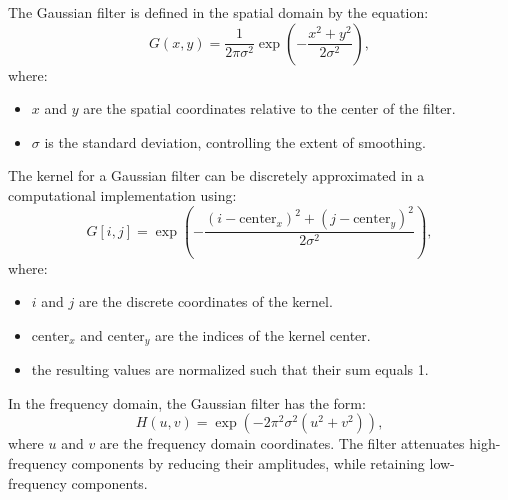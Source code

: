 \documentclass[11pt, conference, letterpaper]{IEEEtran}
\begin{document}
The Gaussian filter is defined in the spatial domain by the equation:
\[
G(x, y) = \frac{1}{2\pi\sigma^2} \exp\left(-\frac{x^2 + y^2}{2\sigma^2}\right),
\]
where:
\begin{itemize}
    \item \(x\) and \(y\) are the spatial coordinates relative to the center of the filter.
    \item \(\sigma\) is the standard deviation, controlling the extent of smoothing.
\end{itemize}

The kernel for a Gaussian filter can be discretely approximated in a computational implementation using:
\[
G[i, j] = \exp\left(-\frac{(i - \text{center}_x)^2 + (j - \text{center}_y)^2}{2\sigma^2}\right),
\]
where:
\begin{itemize}
    \item \(i\) and \(j\) are the discrete coordinates of the kernel.
    \item \(\text{center}_x\) and \(\text{center}_y\) are the indices of the kernel center.
    \item the resulting values are normalized such that their sum equals 1.
\end{itemize}

In the frequency domain, the Gaussian filter has the form:
\[
H(u, v) = \exp\left(-2\pi^2\sigma^2 (u^2 + v^2)\right),
\]
where \(u\) and \(v\) are the frequency domain coordinates. The filter attenuates high-frequency components by reducing their amplitudes, while retaining low-frequency components.
\end{document}
